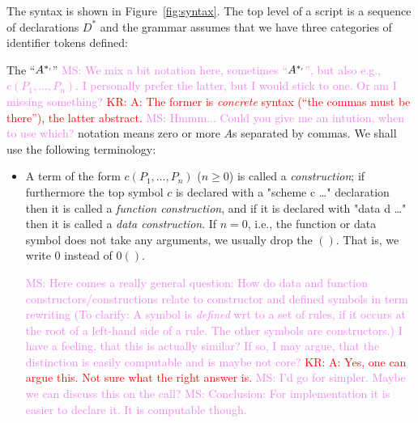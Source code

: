 \documentclass[letterpaper,11pt]{article}
\newcommand{\KR}[1]{\textcolor{red}{KR: #1}}
\newcommand{\MS}[1]{\textcolor{violet}{MS: #1}}
\begin{document}
\begin{definition}\label{def:syntax}
  The \hax syntax is shown in Figure~\ref{fig:syntax}. The top level of a \hax script is a sequence
  of declarations $D^*$ and the grammar assumes that we have three categories of identifier tokens
  defined:
  The ``$A^{*\kw,}$'' 
  \MS{We mix a bit notation here, sometimes ``$A^{*\kw,}$'', but also e.g., $c(P_1,…,P_n)$. I
    personally prefer the latter, but I would stick to one. Or am I missing something?}
  \KR{A: The former is \emph{concrete} syntax (``the commas must be there''), the latter abstract.} 
  \MS{Hmmm... Could you give me an intution, when to use which?}
  notation means zero or more $A$s separated by commas. We shall use the
  following terminology:
  \begin{itemize}

  \item A term of the form $c(P_1,…,P_n)$ ($n≥0$) is called a \emph{construction}; if furthermore
    the top symbol $c$ is declared with a "scheme c {…}" declaration then it is called a
    \emph{function construction}, and if it is declared with "data d {…}" then it is called a
    \emph{data construction}. If $n=0$, i.e., the function or data symbol does not take any
      arguments, we usually drop the $()$. That is, we write $0$ instead of $0()$.
    
    \MS{Here comes a really general question: How do data and function constructors/constructions
      relate to constructor and defined symbols in term rewriting (To clarify: A symbol is
      \emph{defined} wrt to a set of rules, if it occurs at the root of a left-hand side of a
      rule. The other symbols are constructors.) I have a feeling, that this is actually similar?
      If so, I may argue, that the distinction is easily computable and is maybe not core?  } \KR{A:
      Yes, one can argue this. Not sure what the right answer is.}  \MS{I'd go for simpler. Maybe we
      can discuss this on the call?}  \MS{Conclusion: For implementation it is easier to declare
      it. It is computable though.}


\end{itemize}
\end{definition}
\end{document}
